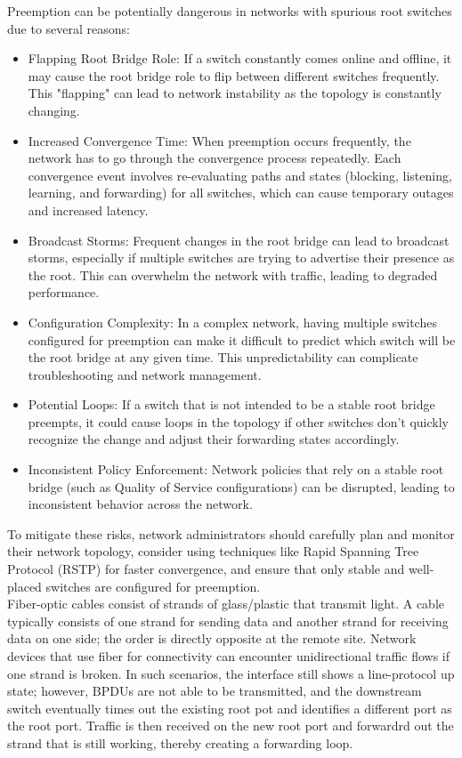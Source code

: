 \documentclass{article}
\begin{document}
Preemption can be potentially dangerous in networks with spurious root switches due to several reasons:
\begin{itemize}
\item Flapping Root Bridge Role: If a switch constantly comes online and offline, it may cause the root bridge role to flip between different switches frequently. This "flapping" can lead to network instability as the topology is constantly changing.
\item Increased Convergence Time: When preemption occurs frequently, the network has to go through the convergence process repeatedly. Each convergence event involves re-evaluating paths and states (blocking, listening, learning, and forwarding) for all switches, which can cause temporary outages and increased latency.
\item Broadcast Storms: Frequent changes in the root bridge can lead to broadcast storms, especially if multiple switches are trying to advertise their presence as the root. This can overwhelm the network with traffic, leading to degraded performance.
\item Configuration Complexity: In a complex network, having multiple switches configured for preemption can make it difficult to predict which switch will be the root bridge at any given time. This unpredictability can complicate troubleshooting and network management.
\item Potential Loops: If a switch that is not intended to be a stable root bridge preempts, it could cause loops in the topology if other switches don't quickly recognize the change and adjust their forwarding states accordingly.
\item Inconsistent Policy Enforcement: Network policies that rely on a stable root bridge (such as Quality of Service configurations) can be disrupted, leading to inconsistent behavior across the network.
\end{itemize}

	To mitigate these risks, network administrators should carefully plan and monitor their network topology, consider using techniques like Rapid Spanning Tree Protocol (RSTP) for faster convergence, and ensure that only stable and well-placed switches are configured for preemption.\\

	Fiber-optic cables consist of strands of glass/plastic that transmit light. A cable typically consists of one strand for sending data and another strand for receiving data on one side; the order is directly opposite at the remote site. Network devices that use fiber for connectivity can encounter unidirectional traffic flows if one strand is broken. In such scenarios, the interface still shows a line-protocol up state; however, BPDUs are not able to be transmitted, and the downstream switch eventually times out the existing root pot and identifies a different port as the root port. Traffic is then received on the new root port and forwardrd out the strand that is still working, thereby creating a forwarding loop.\\
\end{document}
